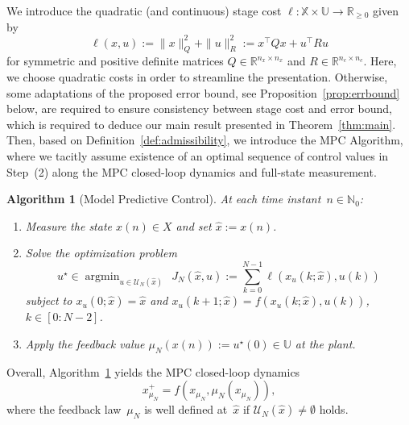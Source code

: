 \documentclass{article}
\numberwithin{equation}{section}
\newtheorem{algorithm}[theorem]{Algorithm}
\newcommand{\nx}{n_x}
\newcommand{\nc}{n_c}
\newcommand{\calU}{\mathcal U}
\newcommand{\bX}{\mathbb X}
\newcommand{\bU}{\mathbb U}
\begin{document}
	\noindent We introduce the quadratic %
	(and continuous) stage cost $\ell: \bX \times \bU \rightarrow \mathbb{R}_{\geq 0}$ given by
	\begin{equation}\label{eq:stage_cost}
	\ell(x,u) := \| x \|_Q^2 + \| u \|_R^2 := x^\top Q x + u^\top R u
	\end{equation}
	for symmetric and positive definite matrices $Q \in \mathbb{R}^{\nx \times \nx}$ and $R \in \mathbb{R}^{\nc \times \nc}$. Here, we choose quadratic costs in order to streamline the presentation. Otherwise, some adaptations of the proposed error bound, see Proposition~\ref{prop:errbound} below, are required to ensure consistency between stage cost and error bound, which is required to deduce our main result presented in Theorem~\ref{thm:main}.
	Then, based on Definition~\ref{def:admissibility}, we introduce the MPC Algorithm, %
	where we tacitly assume existence of an optimal sequence of control values in Step~(2) along the MPC closed-loop dynamics and full-state measurement.
	\begin{algorithm}[Model Predictive Control]\label{alg:MPC}
		At each time instant~$n \in \mathbb{N}_0$: %
		\begin{enumerate}
			\item [(1)] Measure the state $x(n) \in X$ and set $\hat{x} := x(n)$. %
			\item [(2)] Solve the optimization problem
			\begin{equation}\nonumber
			u^\star \in \operatorname{argmin}_{u \in \calU_N(\hat{x})}\ \ J_N(\hat{x},u) := \sum_{k=0}^{N - 1} \ell(x_u(k;\hat{x}),u(k)) %
			\end{equation}
			subject to $x_u(0;\hat{x}) = \hat{x}$ and $x_u(k+1;\hat{x}) = f(x_u(k;\hat{x}),u(k))$, $k \in [0:N-2]$.%
			\item [(3)] Apply the feedback value $\mu_N(x(n)) := u^\star(0) \in \bU$ at the plant.
		\end{enumerate}
	\end{algorithm}
	\noindent Overall, Algorithm~\ref{alg:MPC} yields the MPC closed-loop dynamics
	\begin{equation}\label{eq:dynamics_closed_loop}
	x^+_{\mu_N} = f(x_{\mu_N}, \mu_N(x_{\mu_N})),
	\end{equation}
	where the feedback law~$\mu_N$ is well defined at~$\hat{x}$ if $\calU_N(\hat{x}) \neq \emptyset$ holds. 
\end{document}
